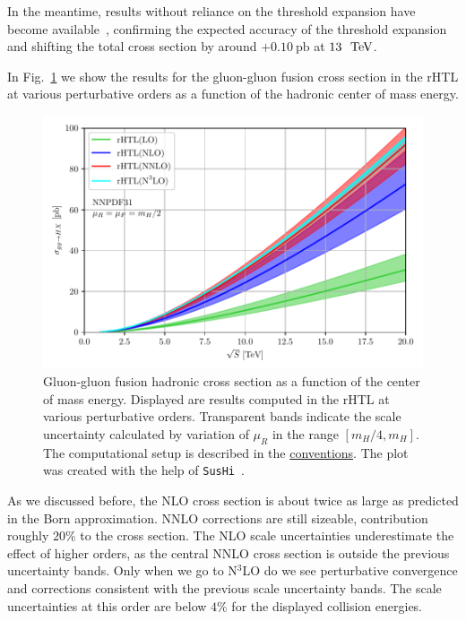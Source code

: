 In the meantime, results without reliance on the threshold expansion have become available~\cite{Mistlberger:2018etf}, confirming the expected accuracy of the threshold expansion and shifting the total cross section by around $+0.10\ \mathrm{pb}$ at $13\ \text{ TeV}$.

In Fig.~\ref{fig:4:energy_scan_rHTL} we show the results for the gluon-gluon fusion cross section in the \acs{rHTL} at various perturbative orders as a function of the hadronic center of mass energy.
\begin{figure}[h]
\centering
\includegraphics[width=\figurewidth]{Images/energy_scan_HTL.pdf}
\caption{Gluon-gluon fusion hadronic cross section as a function of the center of mass energy. Displayed are results computed in the \acs{rHTL} at various perturbative orders. Transparent bands indicate the scale uncertainty calculated by variation of $\mu_R$ in the range $[m_H/4, m_H]$. The computational setup is described in the \hyperref[chap:notation_and_conventions]{conventions}. The plot was created with the help of \texttt{SusHi}~\cite{Harlander:2012pb, Harlander:2016hcx}.}
\label{fig:4:energy_scan_rHTL}
\end{figure}

As we discussed before, the \acs{NLO} cross section is about twice as large as predicted in the Born approximation. \acs{NNLO} corrections are still sizeable, contribution roughly $20\%$ to the cross section. The \acs{NLO} scale uncertainties underestimate the effect of higher orders, as the central \acs{NNLO} cross section is outside the previous uncertainty bands. Only when we go to N${}^3$LO do we see perturbative convergence and corrections consistent with the previous scale uncertainty bands. The scale uncertainties at this order are below $4\%$ for the displayed collision energies.

